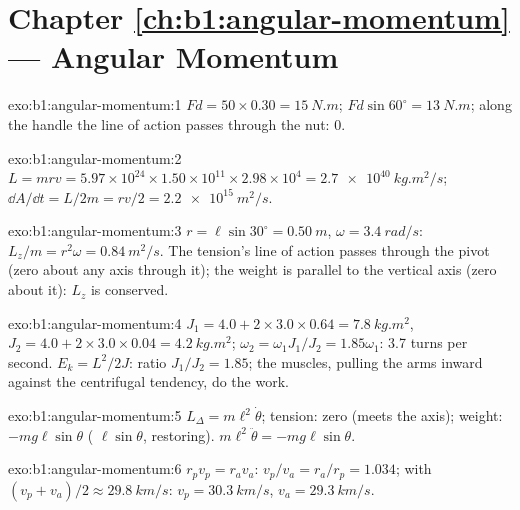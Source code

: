 \section*{Chapter \ref{ch:b1:angular-momentum} --- Angular Momentum}

\begin{solution}{exo:b1:angular-momentum:1}
$Fd = 50 \times 0.30 = \qty{15}{N.m}$; $Fd\sin 60^\circ = \qty{13}{N.m}$;
along the handle the line of action passes through the nut: $0$.
\end{solution}

\begin{solution}{exo:b1:angular-momentum:2}
$L = mrv = 5.97\times10^{24} \times 1.50\times10^{11} \times 2.98\times10^4 =
\qty{2.7e40}{kg.m^2/s}$; $\dd A/\dd t = L/2m = rv/2 = \qty{2.2e15}{m^2/s}$.
\end{solution}

\begin{solution}{exo:b1:angular-momentum:3}
$r = \ell\sin 30^\circ = \qty{0.50}{m}$, $\omega = \qty{3.4}{rad/s}$:
$L_z/m = r^2\omega = \qty{0.84}{m^2/s}$. The tension's line of action
passes through the pivot (zero  about any axis through it); the
weight is parallel to the vertical axis (zero  about it): $L_z$
is conserved.
\end{solution}

\begin{solution}{exo:b1:angular-momentum:4}
$J_1 = 4.0 + 2 \times 3.0 \times 0.64 = \qty{7.8}{kg.m^2}$, $J_2 = 4.0 +
2 \times 3.0 \times 0.04 = \qty{4.2}{kg.m^2}$; $\omega_2 = \omega_1J_1/J_2 =
1.85\omega_1$: \qty{3.7}{} turns per second. $E_k = L^2/2J$: ratio
$J_1/J_2 = 1.85$; the muscles, pulling the arms inward against the
centrifugal tendency, do the work.
\end{solution}

\begin{solution}{exo:b1:angular-momentum:5}
$L_\Delta = m\ell^2\dot\theta$; tension: zero  (meets the axis);
weight: $-mg\ell\sin\theta$ ( $\ell\sin\theta$, restoring).
$m\ell^2\ddot\theta = -mg\ell\sin\theta$.
\end{solution}

\begin{solution}{exo:b1:angular-momentum:6}
$r_pv_p = r_av_a$: $v_p/v_a = r_a/r_p = 1.034$; with $(v_p + v_a)/2 \approx
\qty{29.8}{km/s}$: $v_p = \qty{30.3}{km/s}$, $v_a = \qty{29.3}{km/s}$.
\end{solution}

